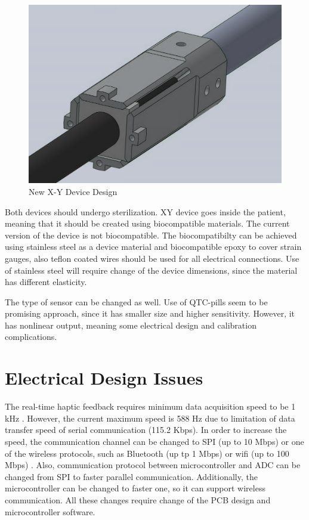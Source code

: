\begin{figure}[h]
	\begin{center}
		\includegraphics[width=120mm]{fig/methods/new_xy_dev.png}
	\end{center}
	\vspace{-4mm}
	\caption[New X-Y Device Design]
	{New X-Y Device Design}
	\label{fig:NewXYDesign}
	\vspace{-2mm}
\end{figure}
	
	Both devices should undergo sterilization. XY device goes inside the patient, meaning that it should be created using biocompatible materials. The current version of the device is not biocompatible. The biocompatibilty can be achieved using stainless steel as a device material and biocompatible epoxy to cover strain gauges, also teflon coated wires should be used for all electrical connections. Use of stainless steel will require change of the device dimensions, since the material has different elasticity.
	
		The type of sensor can be changed as well. Use of QTC-pills seem to be promising approach, since it has smaller size and higher sensitivity. However, it has nonlinear output, meaning some electrical design and calibration complications.
	
\section{Electrical Design Issues}
	The real-time haptic feedback requires minimum data acquisition speed to be 1 kHz \cite{seungmoon_choi_effect_2004}. However, the current maximum speed is 588 Hz due to limitation of data transfer speed of serial communication (115.2 Kbps). In order to increase the speed, the communication channel can be changed to SPI (up to 10 Mbps) \cite{_uart_porotocol} or one of the wireless protocols, such as Bluetooth (up tp 1 Mbps) or wifi (up to 100 Mbps) \cite{_wireless_protocols}. Also, communication protocol between microcontroller and ADC can be changed from SPI to faster parallel communication. Additionally, the microcontroller can be changed to faster one, so it can support wireless communication. All these changes require change of the PCB design and microcontroller software. 
	

